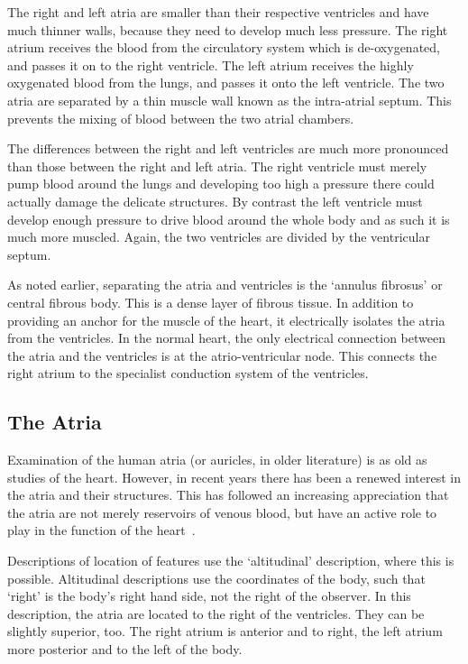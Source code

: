 The right and left atria are smaller than their respective ventricles and have
much thinner walls, because they need to develop much less pressure.  The right
atrium receives the blood from the circulatory system which is de-oxygenated,
and passes it on to the right ventricle.  The left atrium receives the highly
oxygenated blood from the lungs, and passes it onto the left ventricle.  The two
atria are separated by a thin muscle wall known as the intra-atrial septum.
This prevents the mixing of blood between the two atrial chambers.

The differences between the right and left ventricles are much more pronounced
than those between the right and left atria.  The right ventricle must merely
pump blood around the lungs and developing too high a pressure there could
actually damage the delicate structures.  By contrast the left ventricle must
develop enough pressure to drive blood around the whole body and as such it is
much more muscled.  Again, the two ventricles are divided by the ventricular
septum.

As noted earlier, separating the atria and ventricles is the `annulus fibrosus'
or central fibrous body.
This is a dense layer of fibrous tissue.
In addition to providing an anchor for the muscle of the heart, it electrically
isolates the atria from the ventricles.
In the normal heart, the only electrical connection between the atria and the
ventricles is at the atrio-ventricular node.
This connects the right atrium to the specialist conduction system of the
ventricles.

\subsection{The Atria}

Examination of the human atria (or auricles, in older literature) is as old as studies
of the heart.
However, in recent years there has been a renewed interest in the
atria and their structures.
This has followed an increasing appreciation that the atria are not merely
reservoirs of venous blood, but have an active role to play in the function of
the heart~\cite{Ho2002a,Ho2002b,Ho2009,Platonov2007,Platonov2008a}.

Descriptions of location of features use the `altitudinal' description, where
this is possible.
Altitudinal descriptions use the coordinates of the body, such that `right' is
the body's right hand side, not the right of the observer.
In this description, the atria are located to the right of the ventricles.
They can be slightly superior, too.
The right atrium is anterior and to right, the left atrium more posterior and to
the left of the body.

